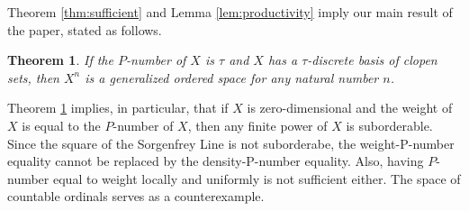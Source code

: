 \documentclass[12pt]{amsart}
\newtheorem{thm}{Theorem}[section]
\begin{document}
\par\bigskip
Theorem \ref{thm:sufficient} and Lemma \ref{lem:productivity} imply our main result of the paper, stated as follows.
\par\bigskip\noindent
\begin{thm}\label{thm:mainpower}
If the  $P$-number of $X$ is $\tau$ and  $X$ has a $\tau$-discrete basis of clopen sets,  then $X^n$ is a generalized ordered space for any natural  number $n$.
\end{thm}

\par\bigskip
Theorem \ref{thm:mainpower} implies, in particular, that if $X$ is zero-dimensional and the weight of $X$ is equal to the $P$-number of $X$, then any finite power of $X$ is suborderable. Since the square of the Sorgenfrey Line is not suborderabe, the weight-P-number equality cannot be replaced by the density-P-number equality. Also, having $P$-number equal to weight locally and uniformly is not sufficient either. The space of countable ordinals serves as a counterexample. 
\end{document}
